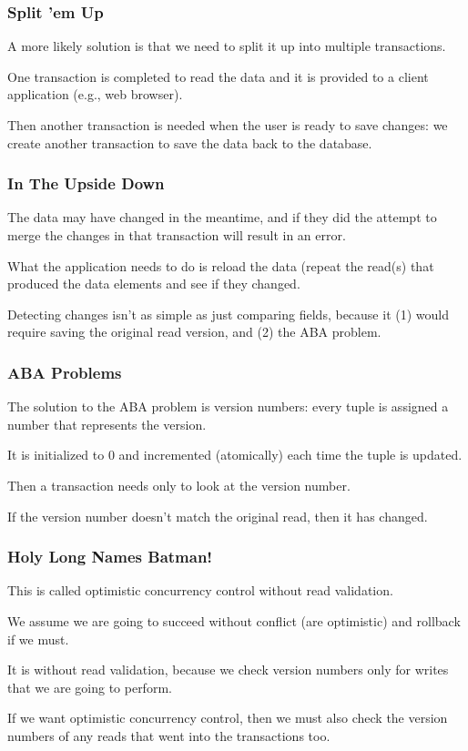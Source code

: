 \begin{frame}
\frametitle{Split 'em Up}

A more likely solution is that we need to split it up into multiple transactions. 

One transaction is completed to read the data and it is provided to a client application (e.g., web browser). 

Then another transaction is needed when the user is ready to save changes: we create another transaction to save the data back to the database. 


\end{frame}

\begin{frame}
\frametitle{In The Upside Down}

The data may have changed in the meantime, and if they did the attempt to merge the changes in that transaction will result in an error. 

What the application needs to do is reload the data (repeat the read(s) that produced the data elements and see if they changed. 

Detecting changes isn't as simple as just comparing fields, because it (1) would require saving the original read version, and (2) the ABA problem.

\end{frame}

\begin{frame}
\frametitle{ABA Problems}

The solution to the ABA problem is version numbers: every tuple is assigned a number that represents the version. 

It is initialized to 0 and incremented (atomically) each time the tuple is updated. 

Then a transaction needs only to look at the version number. 

If the version number doesn't match the original read, then it has changed.
\end{frame}


\begin{frame}
\frametitle{Holy Long Names Batman!}
This is called \alert{optimistic concurrency control without read validation}. 

We assume we are going to succeed without conflict (are optimistic) and rollback if we must. 

It is without read validation, because we check version numbers only for writes that we are going to perform. 

If we want optimistic concurrency control, then we must also check the version numbers of any reads that went into the transactions too.

\end{frame}

